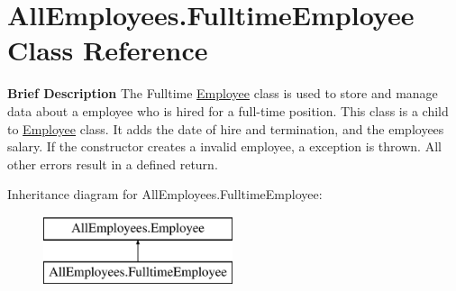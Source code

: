 \hypertarget{class_all_employees_1_1_fulltime_employee}{}\section{All\+Employees.\+Fulltime\+Employee Class Reference}
\label{class_all_employees_1_1_fulltime_employee}


{\bfseries Brief Description} The Fulltime \hyperlink{class_all_employees_1_1_employee}{Employee} class is used to store and manage data about a employee who is hired for a full-\/time position. This class is a child to \hyperlink{class_all_employees_1_1_employee}{Employee} class. It adds the date of hire and termination, and the employees salary. If the constructor creates a invalid employee, a exception is thrown. All other errors result in a defined return.  


Inheritance diagram for All\+Employees.\+Fulltime\+Employee\+:\begin{figure}[H]
\begin{center}
\leavevmode
\includegraphics[height=2.000000cm]{class_all_employees_1_1_fulltime_employee}
\end{center}
\end{figure}
